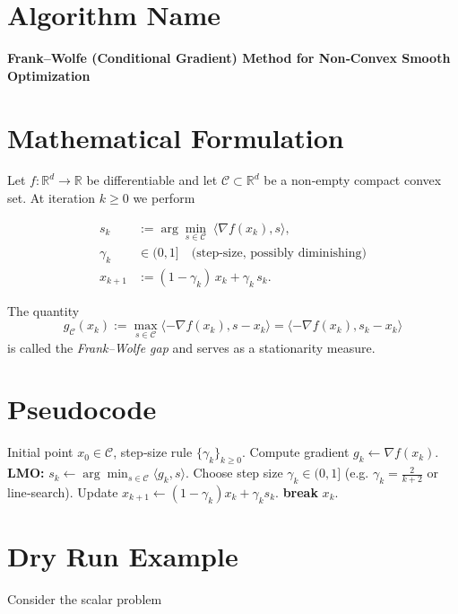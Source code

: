 \documentclass{article}
\newcommand{\ip}[2]{\langle #1,#2\rangle}
\newcommand{\R}{\mathbb{R}}
\begin{document}
\section*{Algorithm Name}
\textbf{Frank–Wolfe (Conditional Gradient) Method for Non‑Convex Smooth Optimization}

\section*{Mathematical Formulation}
Let $f:\R^{d}\rightarrow\R$ be differentiable and let $\mathcal C\subset\R^{d}$ be a non‑empty compact convex set.  
At iteration $k\ge 0$ we perform

\begin{align}
s_k &:= \arg\min_{s\in\mathcal C}\;\ip{\nabla f(x_k)}{s}, \tag{LMO}\\[4pt]
\gamma_k &\in (0,1] \quad\text{(step‑size, possibly diminishing)}\\[4pt]
x_{k+1} &:= (1-\gamma_k)\,x_k + \gamma_k\, s_k . \tag{FW\;update}
\end{align}

The quantity 
\[
g_{\mathcal C}(x_k):=\max_{s\in\mathcal C}\ip{-\nabla f(x_k)}{s-x_k}
       =\ip{-\nabla f(x_k)}{s_k-x_k}
\]
is called the \emph{Frank–Wolfe gap} and serves as a stationarity measure.

\section*{Pseudocode}
\begin{algorithm}[H]
\caption{Frank–Wolfe for Non‑Convex $f$}
\begin{algorithmic}[1]
\Require Initial point $x_0\in\mathcal C$, step‑size rule $\{\gamma_k\}_{k\ge0}$.
    \State Compute gradient $g_k\gets\nabla f(x_k)$.
    \State \textbf{LMO:} $s_k \gets \displaystyle\arg\min_{s\in\mathcal C}\ip{g_k}{s}$.
    \State Choose step size $\gamma_k\in(0,1]$ (e.g. $\gamma_k=\frac{2}{k+2}$ or line‑search).
    \State Update $x_{k+1}\gets (1-\gamma_k)x_k+\gamma_k s_k$.
        \State \textbf{break}
    \EndIf
\EndFor
\State \Return $x_{k}$.
\end{algorithmic}
\end{algorithm}

\section*{Dry Run Example}
Consider the scalar problem  
\end{document}
